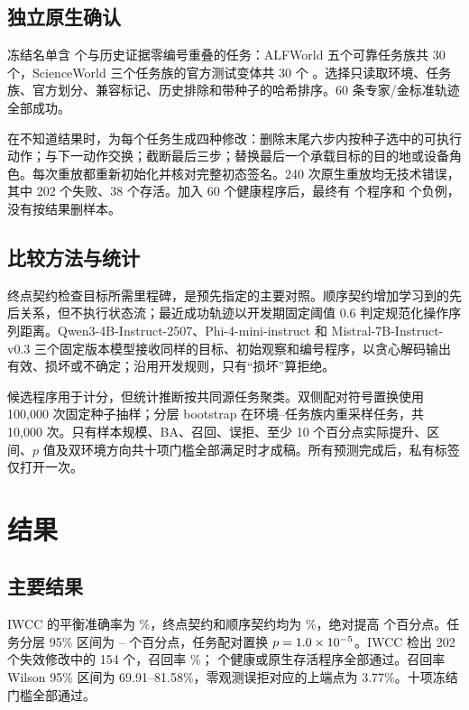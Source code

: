 \documentclass[10pt]{article}
\begin{document}
\subsection{独立原生确认}
冻结名单含 \TaskCount{} 个与历史证据零编号重叠的任务：ALFWorld 五个可靠任务族共 30 个，ScienceWorld 三个任务族的官方测试变体共 30 个 \citep{shridhar2021alfworld,wang2022scienceworld}。选择只读取环境、任务族、官方划分、兼容标记、历史排除和带种子的哈希排序。60 条专家/金标准轨迹全部成功。

在不知道结果时，为每个任务生成四种修改：删除末尾六步内按种子选中的可执行动作；与下一动作交换；截断最后三步；替换最后一个承载目标的目的地或设备角色。每次重放都重新初始化并核对完整初态签名。240 次原生重放均无技术错误，其中 202 个失败、38 个存活。加入 60 个健康程序后，最终有 \CandidateCount{} 个程序和 \ControlCount{} 个负例，没有按结果删样本。

\subsection{比较方法与统计}
终点契约检查目标所需里程碑，是预先指定的主要对照。顺序契约增加学习到的先后关系，但不执行状态流；最近成功轨迹以开发期固定阈值 0.6 判定规范化操作序列距离。Qwen3-4B-Instruct-2507、Phi-4-mini-instruct 和 Mistral-7B-Instruct-v0.3 三个固定版本模型接收同样的目标、初始观察和编号程序，以贪心解码输出有效、损坏或不确定；沿用开发规则，只有“损坏”算拒绝。

候选程序用于计分，但统计推断按共同源任务聚类。双侧配对符号置换使用 100,000 次固定种子抽样；分层 bootstrap 在环境--任务族内重采样任务，共 10,000 次。只有样本规模、BA、召回、误拒、至少 10 个百分点实际提升、区间、$p$ 值及双环境方向共十项门槛全部满足时才成稿。所有预测完成后，私有标签仅打开一次。

\section{结果}
\subsection{主要结果}


IWCC 的平衡准确率为 \IWCCBA\%，终点契约和顺序契约均为 \EndpointBA\%，绝对提高 \GainPoints{} 个百分点。任务分层 95\% 区间为 \GainCILow--\GainCIHigh{} 个百分点，任务配对置换 $p=1.0\times10^{-5}$。IWCC 检出 202 个失效修改中的 154 个，召回率 \IWCCRecall\%；\ControlCount{} 个健康或原生存活程序全部通过。召回率 Wilson 95\% 区间为 69.91--81.58\%，零观测误拒对应的上端点为 3.77\%。十项冻结门槛全部通过。
\end{document}
